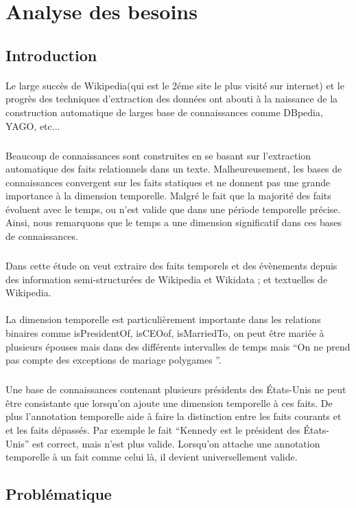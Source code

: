 \section*{Analyse des besoins}
\subsection*{Introduction}
\paragraph{}
Le large succès de Wikipedia(qui est le 2éme site le plus visité sur internet) et le progrès des techniques d’extraction des données ont abouti à la naissance de la construction automatique  de larges base de connaissances comme DBpedia, YAGO, etc...
\subparagraph{}
Beaucoup de connaissances sont construites en se basant sur l’extraction automatique des faits relationnels dans un texte.
Malheureusement, les bases de connaissances convergent sur les faits statiques et ne donnent pas une grande importance à la dimension temporelle.
Malgré le fait que la majorité des faits évoluent avec le temps, ou n'est valide que dans une période temporelle précise.
Ainsi, nous remarquons que le temps a une dimension significatif dans ces bases de connaissances.
\subparagraph{}
Dans cette étude on veut extraire des faits temporels et des évènements depuis des information semi-structurées de Wikipedia et Wikidata ; et textuelles de Wikipedia.
\paragraph{}
La dimension temporelle est particulièrement importante dans les relations binaires comme isPresidentOf, isCEOof, isMarriedTo, on peut être mariée à plusieurs épouses mais dans des différents intervalles de temps mais “On ne prend pas compte des exceptions de mariage polygames ”.
\subparagraph{}
Une base de connaissances contenant plusieurs présidents des États-Unis ne peut être consistante que lorsqu’on ajoute une dimension temporelle à ces faits. De plus l’annotation temporelle aide à faire la distinction entre les faits courants et et les faits dépassés.
Par exemple le fait “Kennedy est le président des États-Unis” est correct, mais n'est plus valide.
Lorsqu’on attache une annotation temporelle à un fait comme celui là, il devient universellement valide.
\subsection*{Problématique}

